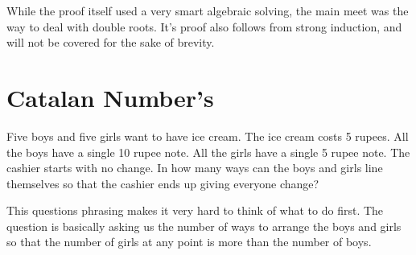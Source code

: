 While the proof itself used a very smart algebraic solving, the main meet was the way to deal with double roots. It's proof also follows from strong induction, and will not be covered for the sake of brevity.
\section{Catalan Number's}
\begin{example}
    Five boys and five girls want to have ice cream. The ice cream costs 5 rupees. All the boys have a single 10 rupee note. All the girls have a single 5 rupee note. The cashier starts with no change. In how many ways can the boys and girls line themselves so that the cashier ends up giving everyone change?
\end{example}
This questions phrasing makes it very hard to think of what to do first. The question is basically asking us the number of ways to arrange the boys and girls so that the number of girls at any point is more than the number of boys.  
